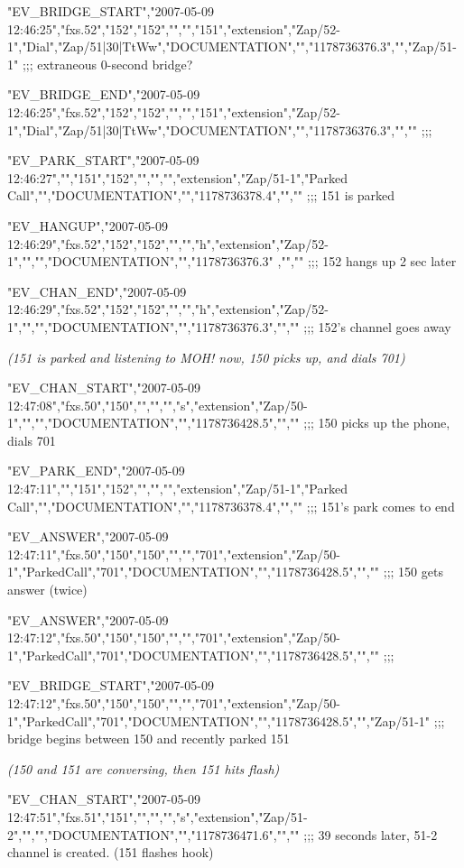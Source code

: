 \begin{astlisting}
"EV\_BRIDGE\_START","2007-05-09 12:46:25","fxs.52","152","152","","","151","extension","Zap/52-1","Dial","Zap/51|30|TtWw","DOCUMENTATION","","1178736376.3","","Zap/51-1"  ;;; extraneous 0-second bridge?

"EV\_BRIDGE\_END","2007-05-09 12:46:25","fxs.52","152","152","","","151","extension","Zap/52-1","Dial","Zap/51|30|TtWw","DOCUMENTATION","","1178736376.3","",""            ;;;

"EV\_PARK\_START","2007-05-09 12:46:27","","151","152","","","","extension","Zap/51-1","Parked Call","","DOCUMENTATION","","1178736378.4","",""                            ;;; 151 is parked

"EV\_HANGUP","2007-05-09 12:46:29","fxs.52","152","152","","","h","extension","Zap/52-1","","","DOCUMENTATION","","1178736376.3" ,"",""                                   ;;; 152 hangs up 2 sec later

"EV\_CHAN\_END","2007-05-09 12:46:29","fxs.52","152","152","","","h","extension","Zap/52-1","","","DOCUMENTATION","","1178736376.3","",""                                  ;;; 152's channel goes away

{\it (151 is parked and listening to MOH! now, 150 picks up, and dials 701)}

"EV\_CHAN\_START","2007-05-09 12:47:08","fxs.50","150","","","","s","extension","Zap/50-1","","","DOCUMENTATION","","1178736428.5","",""                                   ;;; 150 picks up the phone, dials 701

"EV\_PARK\_END","2007-05-09 12:47:11","","151","152","","","","extension","Zap/51-1","Parked Call","","DOCUMENTATION","","1178736378.4","",""                              ;;; 151's park comes to end

"EV\_ANSWER","2007-05-09 12:47:11","fxs.50","150","150","","","701","extension","Zap/50-1","ParkedCall","701","DOCUMENTATION","","1178736428.5","",""                     ;;; 150 gets answer (twice)

"EV\_ANSWER","2007-05-09 12:47:12","fxs.50","150","150","","","701","extension","Zap/50-1","ParkedCall","701","DOCUMENTATION","","1178736428.5","",""                     ;;;

"EV\_BRIDGE\_START","2007-05-09 12:47:12","fxs.50","150","150","","","701","extension","Zap/50-1","ParkedCall","701","DOCUMENTATION","","1178736428.5","","Zap/51-1"       ;;; bridge begins between 150 and recently parked 151

{\it (150 and 151 are conversing, then 151 hits flash)}

"EV\_CHAN\_START","2007-05-09 12:47:51","fxs.51","151","","","","s","extension","Zap/51-2","","","DOCUMENTATION","","1178736471.6","",""                                   ;;; 39 seconds later, 51-2 channel is created. (151 flashes hook)


\end{astlisting}
